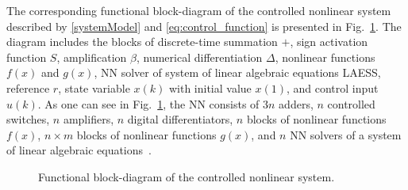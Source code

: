 \par
The corresponding functional block-diagram of the controlled nonlinear
system described by \eqref{systemModel} and \eqref{eq:control_function}
is presented in Fig.~\ref{fig:clean-system}.  The diagram includes the blocks of
discrete-time summation $+$, sign activation function $S$, amplification $\beta$,
numerical differentiation $\Delta$,
nonlinear functions $f(x)$ and $g(x)$, NN solver of system of linear algebraic equations
LAESS, reference $r$, state variable $x(k)$ with initial value $x(1)$, and
control input $u(k)$. As one can see in Fig.~\ref{fig:clean-system}, the NN consists
of $3n$ adders, $n$ controlled switches, $n$ amplifiers, $n$ digital differentiators, $n$
blocks of nonlinear functions $f(x)$, $n \times m$ blocks of nonlinear functions $g(x)$, and
$n$ NN solvers of a system of linear algebraic equations~\cite{tymoshchuk2024tracking}.
\begin{figure}[H]
	\centering
	
	\caption{Functional block-diagram of the controlled nonlinear system.}
	\label{fig:clean-system}
\end{figure}
